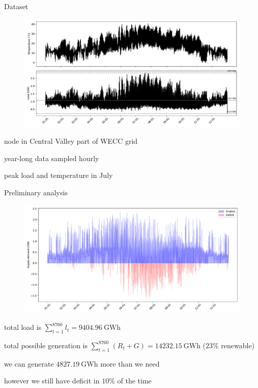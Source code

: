 \documentclass[aspectratio=169,11pt]{beamer}
\begin{document}
\begin{frame}{Dataset}
	
\begin{figure}
\centering
\includegraphics[width=0.8\columnwidth]{./figures/temp_load.pdf}
\end{figure}

\BIT
\item node in Central Valley part of WECC grid
\item year-long data sampled hourly
\item peak load and temperature in July
\EIT
	
\end{frame}

\begin{frame}{Preliminary analysis}
	
\begin{figure}
\centering
\includegraphics[width=0.8\columnwidth]{./figures/surplus_deficit.pdf}
\end{figure}

\BIT
\item total load is $\sum_{t=1}^{8760} l_t = 9404.96 \ \text{GWh}$
\item total possible generation is $\sum_{t=1}^{8760} (R_t + G) = 14232.15 \ \text{GWh}$ ($23\%$ renewable)
\item we can generate $4827.19 \ \text{GWh}$ more than we need
\item however we still have deficit in $10\%$ of the time 
\EIT
\end{frame}
\end{document}
